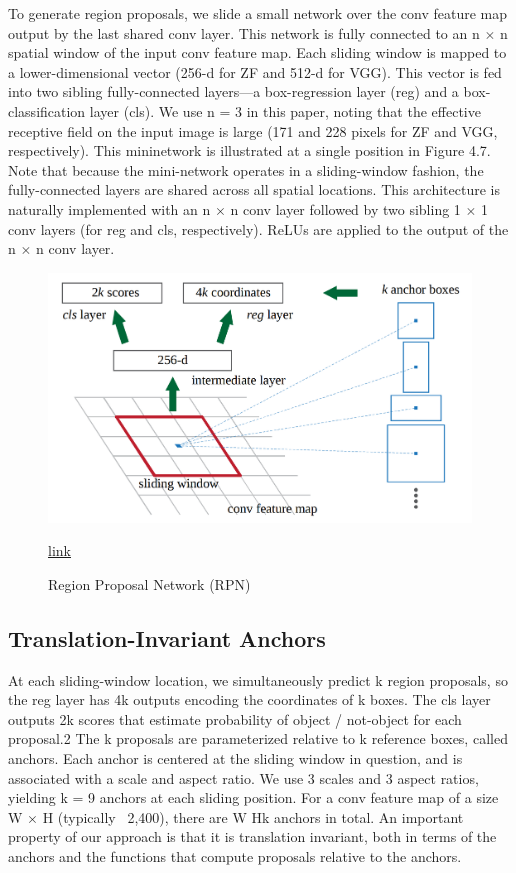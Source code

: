 To generate region proposals, we slide a small network over the conv feature map output by the last shared conv layer. This network is fully connected to an n $\times$ n spatial window of the input conv feature map. Each sliding window is mapped to a lower-dimensional vector (256-d for ZF and 512-d for VGG). This vector is fed into two sibling fully-connected layers—a box-regression layer (reg) and a box-classification layer (cls). We use n = 3 in this paper, noting that the effective receptive field on the input image is large (171 and 228 pixels for ZF and VGG, respectively). This mininetwork is illustrated at a single position in Figure 4.7. Note that because the mini-network operates in a sliding-window fashion, the fully-connected layers are shared across all spatial locations. This architecture is naturally implemented with an n $\times$ n conv layer followed by two sibling 1 $\times$ 1 conv layers (for reg and cls, respectively). ReLUs are applied to the output of the n $\times$ n conv layer. 
\noindent
\begin{figure}
	\centering
	\includegraphics[width=\linewidth]{img16}
	\caption{Region Proposal Network (RPN)} \href{https://medium.com/@tanaykarmarkar/region-proposal-network-rpn-backbone-of-faster-r-cnn-4a744a38d7f9}{link}
	\label{fig:img16}
\end{figure}

\subsection{Translation-Invariant Anchors}

At each sliding-window location, we simultaneously predict k region proposals, so the reg layer
has 4k outputs encoding the coordinates of k boxes. The cls layer outputs 2k scores that estimate
probability of object / not-object for each proposal.2 The k proposals are parameterized relative to
k reference boxes, called anchors. Each anchor is centered at the sliding window in question, and is
associated with a scale and aspect ratio. We use 3 scales and 3 aspect ratios, yielding k = 9 anchors
at each sliding position. For a conv feature map of a size W $\times$ H (typically ~2,400), there are W Hk
anchors in total. An important property of our approach is that it is translation invariant, both in
terms of the anchors and the functions that compute proposals relative to the anchors.



